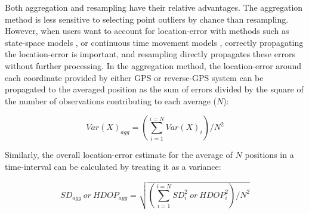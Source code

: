 \documentclass[10pt,paper=a4,headings=standardclasses
]{scrartcl}
\begin{document}
Both aggregation and resampling have their relative advantages. 
The aggregation method is less sensitive to selecting point outliers by chance than resampling.
However, when users want to account for location-error with methods such as state-space models \citep{jonsen2003, jonsen2005, johnson2008}, or continuous time movement models \citep{fleming2014a, noonan2019, gurarie2017, calabrese2016, fleming2020}, correctly propagating the location-error is important, and resampling
directly propagates these errors without further processing.
In the aggregation method, the location-error around each coordinate provided by either GPS or reverse-GPS system can be propagated to the averaged position as the sum of errors divided by the square of the number of observations contributing to each average ($N$):
\begin{linenomath*}
    \begin{equation*}
        Var(X)_{agg} = \left( \sum_{i=1}^{i=N} Var(X)_i \right) / N ^ 2
    \end{equation*}
\end{linenomath*}
Similarly, the overall location-error estimate for the average of $N$ positions in a time-interval can be calculated by treating it as a variance:
\begin{linenomath*}
    \begin{equation*}
        SD_{agg} \ or \ HDOP_{agg} = \sqrt{ \left( \sum_{i=1}^{i=N} SD_i^2 \ or \ HDOP_i^2 \right) / N ^ 2  }
    \end{equation*}    
\end{linenomath*}
\end{document}
